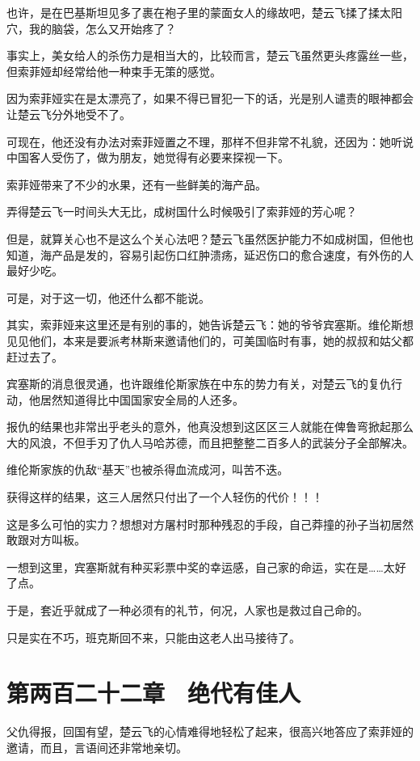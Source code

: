 也许，是在巴基斯坦见多了裹在袍子里的蒙面女人的缘故吧，楚云飞揉了揉太阳穴，我的脑袋，怎么又开始疼了？

事实上，美女给人的杀伤力是相当大的，比较而言，楚云飞虽然更头疼露丝一些，但索菲娅却经常给他一种束手无策的感觉。

因为索菲娅实在是太漂亮了，如果不得已冒犯一下的话，光是别人谴责的眼神都会让楚云飞分外地受不了。

可现在，他还没有办法对索菲娅置之不理，那样不但非常不礼貌，还因为：她听说中国客人受伤了，做为朋友，她觉得有必要来探视一下。

索菲娅带来了不少的水果，还有一些鲜美的海产品。

弄得楚云飞一时间头大无比，成树国什么时候吸引了索菲娅的芳心呢？

但是，就算关心也不是这么个关心法吧？楚云飞虽然医护能力不如成树国，但他也知道，海产品是发的，容易引起伤口红肿溃疡，延迟伤口的愈合速度，有外伤的人最好少吃。

可是，对于这一切，他还什么都不能说。

其实，索菲娅来这里还是有别的事的，她告诉楚云飞：她的爷爷宾塞斯。维伦斯想见见他们，本来是要派考林斯来邀请他们的，可美国临时有事，她的叔叔和姑父都赶过去了。

宾塞斯的消息很灵通，也许跟维伦斯家族在中东的势力有关，对楚云飞的复仇行动，他居然知道得比中国国家安全局的人还多。

报仇的结果也非常出乎老头的意外，他真没想到这区区三人就能在俾鲁弯掀起那么大的风浪，不但手刃了仇人马哈苏德，而且把整整二百多人的武装分子全部解决。

维伦斯家族的仇敌“基天”也被杀得血流成河，叫苦不迭。

获得这样的结果，这三人居然只付出了一个人轻伤的代价！！！

这是多么可怕的实力？想想对方屠村时那种残忍的手段，自己莽撞的孙子当初居然敢跟对方叫板。

一想到这里，宾塞斯就有种买彩票中奖的幸运感，自己家的命运，实在是……太好了点。

于是，套近乎就成了一种必须有的礼节，何况，人家也是救过自己命的。

只是实在不巧，班克斯回不来，只能由这老人出马接待了。

\section{第两百二十二章　绝代有佳人}

父仇得报，回国有望，楚云飞的心情难得地轻松了起来，很高兴地答应了索菲娅的邀请，而且，言语间还非常地亲切。

